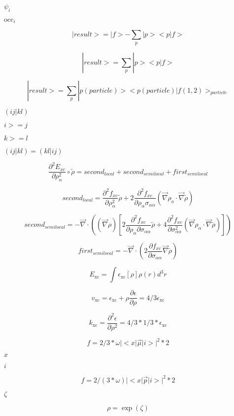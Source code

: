 \documentclass{article}
\begin{document}
$ \psi_i $
\pagebreak

$ \mathrm{occ}_i $
\pagebreak

\[
  |result> = |f> - \sum_p |p><p|f>
\]
\pagebreak

\[
    | result > =  \sum_p | p > <p|f>
\]
\pagebreak

\[
|result> = \sum_p |p(particle)> <p(particle)|f(1,2)>_{particle}
\]
\pagebreak

$(ij|kl)$
\pagebreak

$i>=j$
\pagebreak

$k>=l$
\pagebreak

$(ij|kl)=(kl|ij)$
\pagebreak

\[
  \frac{\partial^2E_{xc}}{\partial \rho_\alpha^2}\circ\tilde\rho
     = second_{local} + second_{semilocal} + first_{semilocal}
\]
\pagebreak

\[
       second_{local} = \frac{\partial^2 f_{xc}}{\partial \rho_\alpha^2}\tilde \rho
       + 2\frac{\partial^2 f_{xc}}{\partial \rho_\alpha\sigma_{\alpha\alpha}}
           \left(\vec\nabla \rho_a\cdot \vec \nabla\tilde\rho\right)
\]
\pagebreak

\[
     second_{semilocal} = -\vec\nabla\cdot\left((\vec\nabla\rho)
            \left[2\frac{\partial^2 f_{xc}}{\partial\rho_\alpha\partial\sigma_{\alpha\alpha}}\tilde\rho
            + 4\frac{\partial^2 f_{xc}}{\partial\sigma_{\alpha\alpha}^2}
               \left(\vec\nabla\rho_\alpha\cdot\vec\nabla\tilde\rho\right)\right]\right)
\]
\pagebreak

\[
     first_{semilocal} =
       -\vec\nabla\cdot\left(2\frac{\partial f_{xc}}{\partial\sigma_{\alpha\alpha}}\vec\nabla\tilde\rho\right)
\]
\pagebreak

\[
   E_\mathrm{xc} = \int\epsilon_\mathrm{xc}[\rho]\rho(r) d^3r
\]
\pagebreak

\[
   v_\mathrm{xc} = \epsilon_\mathrm{xc} + \rho\frac{\partial \epsilon}{\partial \rho}
                 = 4/3\epsilon_\mathrm{xc}
\]
\pagebreak

\[
   k_\mathrm{xc} = \frac{\partial^2\epsilon}{\partial \rho^2} = 4/3*1/3 * \epsilon_\mathrm{xc}
\]
\pagebreak

\[
f = 2/3 * \omega |<x | \vec \mu | i >| ^2 * 2
\]
\pagebreak

$ x $
\pagebreak

$ i $
\pagebreak

\[
f = 2/(3 * \omega) |<x | \vec p | i >| ^2 * 2
\]
\pagebreak

$ \zeta $
\pagebreak

\[
\rho = \exp(\zeta)
\]
\pagebreak
\end{document}
